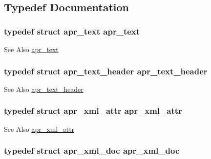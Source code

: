 \subsection{Typedef Documentation}
\hypertarget{group___a_p_r___util___x_m_l_gafddd251818de0015559bc174f81fd743}{
\subsubsection[{apr\-\_\-text}]{\setlength{\rightskip}{0pt plus 5cm}typedef struct {\bf apr\-\_\-text} {\bf apr\-\_\-text}}}\label{group___a_p_r___util___x_m_l_gafddd251818de0015559bc174f81fd743}
\begin{DoxySeeAlso}{See Also}
\hyperlink{structapr__text}{apr\-\_\-text} 
\end{DoxySeeAlso}
\hypertarget{group___a_p_r___util___x_m_l_gaafc6d5ebd59b64a27146cf938a4086e0}{
\subsubsection[{apr\-\_\-text\-\_\-header}]{\setlength{\rightskip}{0pt plus 5cm}typedef struct {\bf apr\-\_\-text\-\_\-header} {\bf apr\-\_\-text\-\_\-header}}}\label{group___a_p_r___util___x_m_l_gaafc6d5ebd59b64a27146cf938a4086e0}
\begin{DoxySeeAlso}{See Also}
\hyperlink{structapr__text__header}{apr\-\_\-text\-\_\-header} 
\end{DoxySeeAlso}
\hypertarget{group___a_p_r___util___x_m_l_ga4889d4d353f0ea0dabae2d5ae58dd07e}{
\subsubsection[{apr\-\_\-xml\-\_\-attr}]{\setlength{\rightskip}{0pt plus 5cm}typedef struct {\bf apr\-\_\-xml\-\_\-attr} {\bf apr\-\_\-xml\-\_\-attr}}}\label{group___a_p_r___util___x_m_l_ga4889d4d353f0ea0dabae2d5ae58dd07e}
\begin{DoxySeeAlso}{See Also}
\hyperlink{structapr__xml__attr}{apr\-\_\-xml\-\_\-attr} 
\end{DoxySeeAlso}
\hypertarget{group___a_p_r___util___x_m_l_ga98eba70878b9460f2530e7a21bb6ae74}{
\subsubsection[{apr\-\_\-xml\-\_\-doc}]{\setlength{\rightskip}{0pt plus 5cm}typedef struct {\bf apr\-\_\-xml\-\_\-doc} {\bf apr\-\_\-xml\-\_\-doc}}}\label{group___a_p_r___util___x_m_l_ga98eba70878b9460f2530e7a21bb6ae74}
